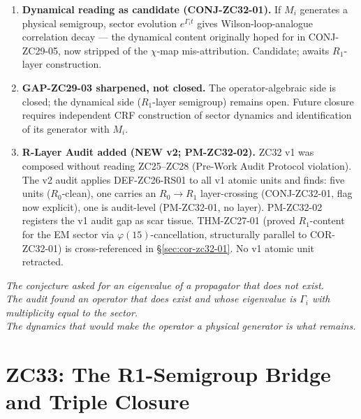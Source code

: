 \documentclass[12pt, a4paper]{article}
\begin{document}
\begin{enumerate}[leftmargin=*, label=\arabic*., noitemsep]
\item \textbf{Dynamical reading as candidate (CONJ-ZC32-01).}
If $M_i$ generates a physical semigroup, sector evolution
$e^{\Gamma_i t}$ gives Wilson-loop-analogue correlation
decay --- the dynamical content originally hoped for in
CONJ-ZC29-05, now stripped of the $\chi$-map mis-attribution.
Candidate; awaits $R_1$-layer construction.

\item \textbf{GAP-ZC29-03 sharpened, not closed.}
The operator-algebraic side is closed; the dynamical side
($R_1$-layer semigroup) remains open. Future closure
requires independent CRF construction of sector dynamics and
identification of its generator with $M_i$.

\item \textbf{R-Layer Audit added (NEW v2; PM-ZC32-02).}
ZC32 v1 was composed without reading ZC25--ZC28
(Pre-Work Audit Protocol violation). The v2 audit applies
DEF-ZC26-RS01 to all v1 atomic units and finds: five units
($R_0$-clean), one carries an $R_0 \to R_1$ layer-crossing
(CONJ-ZC32-01, flag now explicit), one is audit-level
(PM-ZC32-01, no layer). PM-ZC32-02 registers the v1 audit
gap as scar tissue. THM-ZC27-01 (proved $R_1$-content for
the EM sector via $\varphi(15)$-cancellation, structurally
parallel to COR-ZC32-01) is cross-referenced in
§\ref{sec:cor-zc32-01}. No v1 atomic unit retracted.

\end{enumerate}

\bigskip
\begin{center}
\textit{The conjecture asked for an eigenvalue of a
propagator that does not exist.\\
The audit found an operator that does exist
and whose eigenvalue is $\Gamma_i$ with multiplicity equal
to the sector.\\
The dynamics that would make the operator a physical
generator is what remains.}
\end{center}


\section{ZC33: The R1-Semigroup Bridge and Triple Closure}
\label{sec:zc33-r1-semigroup}
\end{document}
